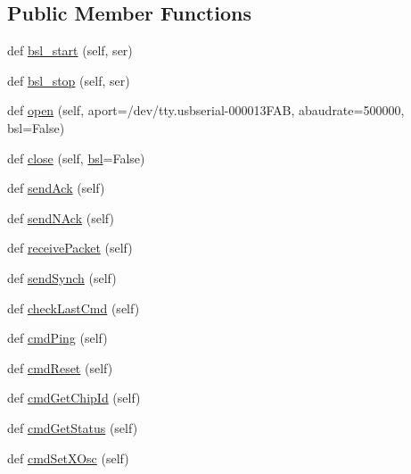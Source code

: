 \subsection*{Public Member Functions}
\begin{DoxyCompactItemize}
\item 
def \hyperlink{classcc2538-bsl_1_1_command_interface_a80a518369c9160bfd51d50a5d7adc9e6}{bsl\+\_\+start} (self, ser)
\item 
def \hyperlink{classcc2538-bsl_1_1_command_interface_ad1404ddd13bd9f63dec61c2c41f39b9e}{bsl\+\_\+stop} (self, ser)
\item 
def \hyperlink{classcc2538-bsl_1_1_command_interface_af71c440ff5871654e7b833420d732b43}{open} (self, aport=\textquotesingle{}/dev/tty.\+usbserial-\/000013\+F\+A\+B\textquotesingle{}, abaudrate=500000, bsl=\+False)
\item 
def \hyperlink{classcc2538-bsl_1_1_command_interface_a196aa05cea791e8cb4df5c88889b909e}{close} (self, \hyperlink{namespacecc2538-bsl_ac16fd91d8739889650b3a1f5e9830137}{bsl}=False)
\item 
def \hyperlink{classcc2538-bsl_1_1_command_interface_a38d44126343e6263cd70c0498ec13a16}{send\+Ack} (self)
\item 
def \hyperlink{classcc2538-bsl_1_1_command_interface_ab3c4c496093b038ba0bd20067d568e84}{send\+N\+Ack} (self)
\item 
def \hyperlink{classcc2538-bsl_1_1_command_interface_aee5863c79abfc6c9788a7e1a8a19fd3c}{receive\+Packet} (self)
\item 
def \hyperlink{classcc2538-bsl_1_1_command_interface_a62a9b9a2803ceb499716038c2e325c50}{send\+Synch} (self)
\item 
def \hyperlink{classcc2538-bsl_1_1_command_interface_a7b16204b3f19e6898b082ecd66dda220}{check\+Last\+Cmd} (self)
\item 
def \hyperlink{classcc2538-bsl_1_1_command_interface_ae6b3cd45742eb95f5520ce4a4f6049cd}{cmd\+Ping} (self)
\item 
def \hyperlink{classcc2538-bsl_1_1_command_interface_aec61a2081369c16c73432b5de6718f08}{cmd\+Reset} (self)
\item 
def \hyperlink{classcc2538-bsl_1_1_command_interface_acccef16c1a3c7517895b297f29ff9ea5}{cmd\+Get\+Chip\+Id} (self)
\item 
def \hyperlink{classcc2538-bsl_1_1_command_interface_a69138bdeee44c0be9969a56095121a4a}{cmd\+Get\+Status} (self)
\item 
def \hyperlink{classcc2538-bsl_1_1_command_interface_a44cf09dc1a1c4324e9c588ae68f6c3de}{cmd\+Set\+X\+Osc} (self)

\end{DoxyCompactItemize}
